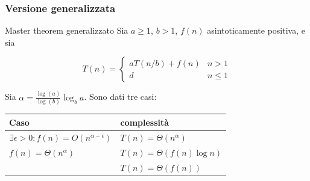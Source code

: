 \subsubsection{Versione generalizzata}
\begin{definizione}{Master theorem generalizzato}
	Sia $ a \geq 1 $, $ b > 1 $, $ f(n) $ asintoticamente positiva, e sia

	\[
		T(n) =
		\begin{cases}
			aT(n/b) + f(n) & n > 1    \\
			d              & n \leq 1
		\end{cases}
	\]

	Sia $ \alpha = \frac{\log \left(a\right)}{\log \left(b\right)} \log_b a $. Sono dati tre casi:



	\newsavebox{\tmp}

	\begin{center}
		\begin{tabular}{ll}
			\toprule
			Caso                                                     & complessità                   \\
			\midrule
			$\exists \epsilon > 0 : f(n) = O(n^{\alpha - \epsilon})$ & $ T(n) = \Theta(n^\alpha)$    \\
			$f(n) = \Theta(n^\alpha)$                                & $ T(n) = \Theta(f(n) \log n)$ \\
			\usebox{\tmp}                                            & $ T(n) = \Theta(f(n))$        \\
			\bottomrule
		\end{tabular}
	\end{center}

\end{definizione}

